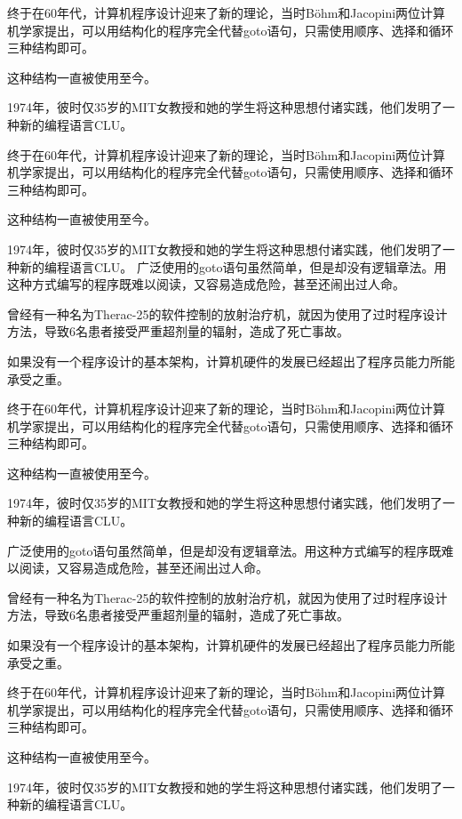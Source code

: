 \documentclass[custom]{linearbook}
\begin{document}
终于在60年代，计算机程序设计迎来了新的理论，当时Böhm和Jacopini两位计算机学家提出，可以用结构化的程序完全代替goto语句，只需使用顺序、选择和循环三种结构即可。

这种结构一直被使用至今。

1974年，彼时仅35岁的MIT女教授和她的学生将这种思想付诸实践，他们发明了一种新的编程语言CLU。

终于在60年代，计算机程序设计迎来了新的理论，当时Böhm和Jacopini两位计算机学家提出，可以用结构化的程序完全代替goto语句，只需使用顺序、选择和循环三种结构即可。

这种结构一直被使用至今。

\begin{fullwidth}

1974年，彼时仅35岁的MIT女教授和她的学生将这种思想付诸实践，他们发明了一种新的编程语言CLU。
广泛使用的goto语句虽然简单，但是却没有逻辑章法。用这种方式编写的程序既难以阅读，又容易造成危险，甚至还闹出过人命。

曾经有一种名为Therac-25的软件控制的放射治疗机，就因为使用了过时程序设计方法，导致6名患者接受严重超剂量的辐射，造成了死亡事故。

如果没有一个程序设计的基本架构，计算机硬件的发展已经超出了程序员能力所能承受之重。

终于在60年代，计算机程序设计迎来了新的理论，当时Böhm和Jacopini两位计算机学家提出，可以用结构化的程序完全代替goto语句，只需使用顺序、选择和循环三种结构即可。

这种结构一直被使用至今。

\end{fullwidth}

1974年，彼时仅35岁的MIT女教授和她的学生将这种思想付诸实践，他们发明了一种新的编程语言CLU。

广泛使用的goto语句虽然简单，但是却没有逻辑章法。用这种方式编写的程序既难以阅读，又容易造成危险，甚至还闹出过人命。

曾经有一种名为Therac-25的软件控制的放射治疗机，就因为使用了过时程序设计方法，导致6名患者接受严重超剂量的辐射，造成了死亡事故。

如果没有一个程序设计的基本架构，计算机硬件的发展已经超出了程序员能力所能承受之重。

终于在60年代，计算机程序设计迎来了新的理论，当时Böhm和Jacopini两位计算机学家提出，可以用结构化的程序完全代替goto语句，只需使用顺序、选择和循环三种结构即可。

这种结构一直被使用至今。

1974年，彼时仅35岁的MIT女教授和她的学生将这种思想付诸实践，他们发明了一种新的编程语言CLU。
\end{document}
